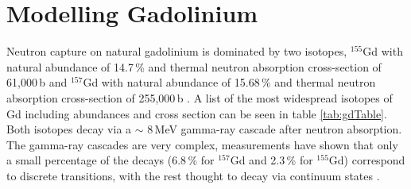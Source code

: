 \section{Modelling Gadolinium}\label{sec:GEANT4Simulation_modellingGadolinium}
Neutron capture on natural gadolinium is dominated by two isotopes, $^{155}$Gd with natural abundance of 14.7\,\% and thermal neutron absorption cross-section of 61,000\,b and $^{157}$Gd with natural abundance of 15.68\,\% and thermal neutron absorption cross-section of 255,000\,b \cite{Abdushukurov_2010}. A list of the most widespread isotopes of Gd including abundances and cross section can be seen in table \ref{tab:gdTable}. Both isotopes decay via a $\sim$ 8\,MeV gamma-ray cascade after neutron absorption. The gamma-ray cascades are very complex, measurements have shown that only a small percentage of the decays (6.8\,\% for $^{157}$Gd and 2.3\,\% for $^{155}$Gd) correspond to discrete transitions, with the rest thought to decay via continuum states \cite{jparc_gdProdNAbsorb_2016}. 

